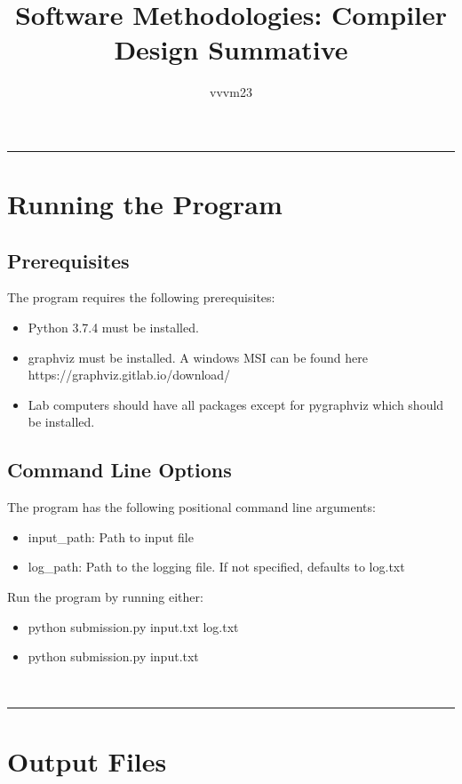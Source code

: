 \documentclass[11pt,a4paper]{article}
\begin{document}
\title{Software Methodologies: Compiler Design Summative}
\author{vvvm23}
\date{}
\maketitle
\hrule

\section{Running the Program}

\subsection{Prerequisites}

The program requires the following prerequisites:

\begin{itemize}
    \item Python 3.7.4 must be installed.
    \item graphviz must be installed. A windows MSI can be found here https://graphviz.gitlab.io/download/
    \item Lab computers should have all packages except for pygraphviz which should be installed.
\end{itemize}

\subsection{Command Line Options}

The program has the following positional command line arguments:
\begin{itemize}
    \item input\_path: Path to input file
    \item log\_path: Path to the logging file. If not specified, defaults to log.txt
\end{itemize}
Run the program by running either:
\begin{itemize}
    \item python submission.py input.txt log.txt
    \item python submission.py input.txt
\end{itemize}
\\

\hrule

\section{Output Files}
\end{document}
